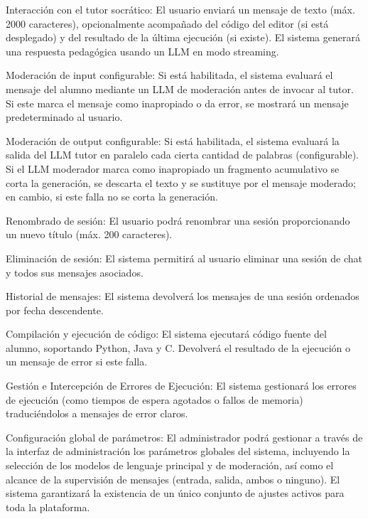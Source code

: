 \begin{functional}
    \item[RF-09.-] Interacción con el tutor socrático: El usuario enviará un mensaje de texto (máx. 2000 caracteres), opcionalmente acompañado del código del editor (si está desplegado) y del resultado de la última ejecución (si existe). El sistema generará una respuesta pedagógica usando un LLM en modo streaming.

    \item[RF-10.-] Moderación de input configurable: Si está habilitada, el sistema evaluará el mensaje del alumno mediante un LLM de moderación antes de invocar al tutor. Si este marca el mensaje como inapropiado o da error, se mostrará un mensaje predeterminado al usuario.

    \item[RF-11.-] Moderación de output configurable: Si está habilitada, el sistema evaluará la salida del LLM tutor en paralelo cada cierta cantidad de palabras (configurable). Si el LLM moderador marca como inapropiado un fragmento acumulativo se corta la generación, se descarta el texto y se sustituye por el mensaje moderado; en cambio, si este falla no se corta la generación.

    \item[RF-12.-] Renombrado de sesión: El usuario podrá renombrar una sesión proporcionando un nuevo título (máx. 200 caracteres).

    \item[RF-13.-] Eliminación de sesión: El sistema permitirá al usuario eliminar una sesión de chat y todos sus mensajes asociados.

    \item[RF-14.-] Historial de mensajes: El sistema devolverá los mensajes de una sesión ordenados por fecha descendente.

    \item[RF-15.-] Compilación y ejecución de código: El sistema ejecutará código fuente del alumno, soportando Python, Java y C. Devolverá el resultado de la ejecución o un mensaje de error si este falla.

    \item[RF-16.-] Gestión e Intercepción de Errores de Ejecución: El sistema gestionará los errores de ejecución (como tiempos de espera agotados o fallos de memoria) traduciéndolos a mensajes de error claros.

    \item[RF-17.-] Configuración global de parámetros: El administrador podrá gestionar a través de la interfaz de administración los parámetros globales del sistema, incluyendo la selección de los modelos de lenguaje principal y de moderación, así como el alcance de la supervisión de mensajes (entrada, salida, ambos o ninguno). El sistema garantizará la existencia de un único conjunto de ajustes activos para toda la plataforma.


\end{functional}
